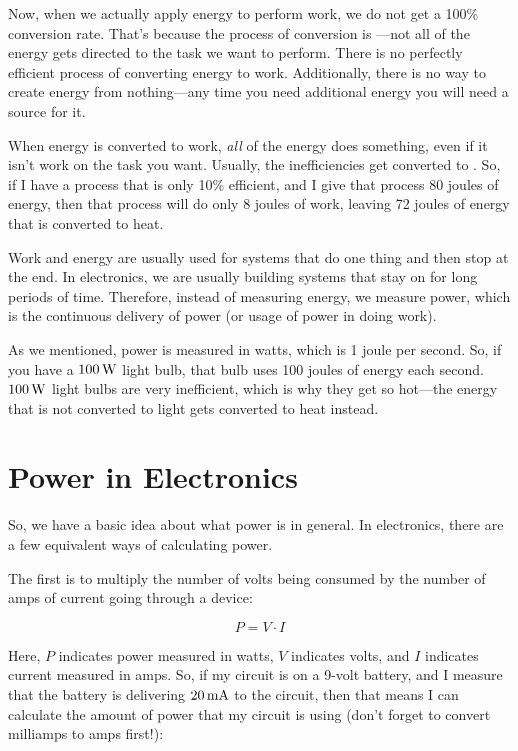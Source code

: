 Now, when we actually apply energy to perform work, we do not get a 100\% conversion rate.
That's because the process of conversion is ---not all of the energy gets directed to the task we want to perform.
There is no perfectly efficient process of converting energy to work.
Additionally, there is no way to create energy from nothing---any time you need additional energy you will need a source for it.

When energy is converted to work, \emph{all} of the energy does something, even if it isn't work on the task you want.
Usually, the inefficiencies get converted to .
So, if I have a process that is only 10\% efficient, and I give that process 80 joules of energy, then that process will do only 8 joules of work, leaving 72 joules of energy that is converted to heat.

Work and energy are usually used for systems that do one thing and then stop at the end.
In electronics, we are usually building systems that stay on for long periods of time.
Therefore, instead of measuring energy, we measure power, which is the continuous delivery of power (or usage of power in doing work).

As we mentioned, power is measured in watts, which is 1 joule per second.
So, if you have a $100\,\si{\watt}$ light bulb, that bulb uses 100 joules of energy each second.
$100\,\si{\watt}$ light bulbs are very inefficient, which is why they get so hot---the energy that is not converted to light gets converted to heat instead.

\section{Power in Electronics}
\label{secpowerelec}

So, we have a basic idea about what power is in general.
In electronics, there are a few equivalent ways of calculating power.

The first is to multiply the number of volts being consumed by the number of amps of current going through a device:

\begin{equation}
P = V\cdot I
\end{equation}

Here, $P$ indicates power measured in watts, $V$ indicates volts, and $I$ indicates current measured in amps.
So, if my circuit is on a 9-volt battery, and I measure that the battery is delivering $20\,\si{\milli\ampere}$ to the circuit, then that means I can calculate the amount of power that my circuit is using (don't forget to convert milliamps to amps first!):

